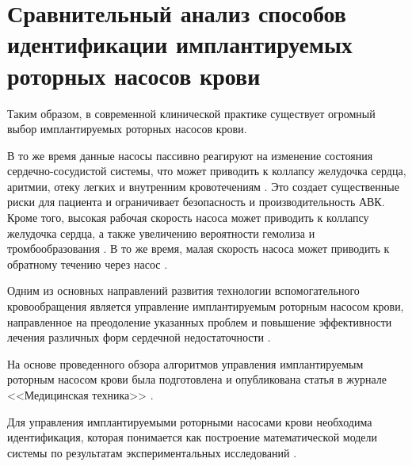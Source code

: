 
\section{Сравнительный анализ способов идентификации имплантируемых роторных насосов крови}\label{identification_review}

Таким образом, в современной клинической практике существует огромный выбор имплантируемых роторных насосов крови.

В то же время данные насосы пассивно реагируют на изменение состояния сердечно-сосудистой системы, что может приводить к коллапсу желудочка сердца, аритмии, отеку легких и внутренним кровотечениям \cite{tchantchaleishvili2017clinical, bozkurt2015physiologic,giridharan_hemodynamic_2015,mahr_intermittent_9000, aggarwal_incidence_2012, wever_pulsatility_2013, vollkron_suction_2007,salamonsen_anatomy_2015}. Это создает существенные риски для пациента и ограничивает безопасность и производительность АВК. Кроме того, высокая рабочая скорость насоса может приводить к коллапсу желудочка сердца, а также увеличению вероятности гемолиза и тромбообразования \cite{Vollkron2006, vollkron_suction_2007,Ng_2013}. В то же время, малая скорость насоса может приводить к обратному течению через насос \cite{giridharan_hemodynamic_2015, bozkurt2015physiologic}. 

Одним из основных направлений развития технологии вспомогательного кровообращения является управление имплантируемым роторным насосом крови, направленное на преодоление указанных проблем и повышение эффективности лечения различных форм сердечной недостаточности \cite{schima_noninvasive_1992,schloglhofer_international,JTD2878,Kyo2012101,lenneman2014treatment,Controller_review}.

На основе проведенного обзора алгоритмов управления имплантируемым роторным насосом крови была подготовлена и опубликована статья в журнале <<Медицинская техника>> \cite{mt3_2016}.

Для управления имплантируемыми роторными насосами крови необходима идентификация, которая понимается как построение математической модели системы по результатам экспериментальных исследований \cite{identification_usa}. 



